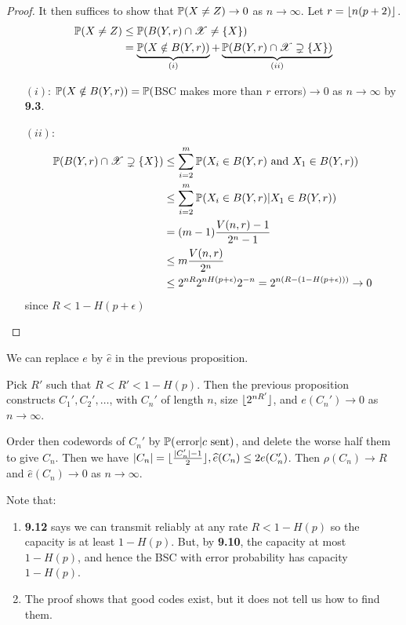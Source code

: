 \documentclass[10pt,a4paper]{article}
\begin{document}
\begin{proof}
It then suffices to show that $\P(X \neq Z) \to 0$ as $n \to \infty$. Let $r = \floor{n(p+2)}$.
\begin{align*}
\P(X \neq Z) &\leq \P(B(Y,r) \cap \mathscr{X} \neq \{X\})\\
&= \underbrace{\P(X \notin B(Y,r))}_{(i)} + \underbrace{\P(B(Y,r) \cap \mathscr{X} \supsetneq \{X\})}_{(ii)}
\end{align*}
\begin{itemize}
\item[$(i)$:] $\P(X \notin B(Y,r)) = \P($BSC makes more than $r$ errors$) \to 0$ as $n \to \infty$ by \textbf{9.3}.
\item[$(ii)$:] \begin{align*}
\P(B(Y,r) \cap \mathscr{X} \supsetneq \{X\}) &\leq \sum_{i=2}^m \P(X_i \in B(Y,r)\text{ and }X_1 \in B(Y,r))\\
&\leq \sum_{i=2}^m \P(X_i \in B(Y,r) | X_1 \in B(Y,r))\\
&= (m-1)\frac{V(n,r)-1}{2^n-1}\\
&\leq m\frac{V(n,r)}{2^n}\\
&\leq 2^{nR}2^{nH(p+\epsilon)}2^{-n} = 2^{n(R-(1-H(p+\epsilon)))} \to 0
\end{align*}
since $R < 1-H(p+\epsilon)$
\end{itemize}
\end{proof}
\begin{proposition}
We can replace $e$ by $\hat{e}$ in the previous proposition.
\end{proposition}
\begin{proposition}
Pick $R'$ such that $R<R'<1-H(p)$. Then the previous proposition constructs $C_1', C_2', \ldots$, with $C_n'$ of length $n$, size $\floor{2^{nR'}}$, and $e(C_n') \to 0$ as $n \to \infty$.

Order then codewords of $C_n'$ by $\P($error$|c\sent)$, and delete the worse half them to give $C_n$. Then we have $|C_n| = \floor{\frac{|C_n'|-1}{2}}, \hat{e}(C_n) \leq 2e(C_n')$. Then $\rho(C_n) \to R$ and $\hat{e}(C_n) \to 0$ as $n \to \infty$.
\end{proposition}
Note that:
\begin{enumerate}
\item \textbf{9.12} says we can transmit reliably at any rate $R < 1-H(p)$ so the capacity is at least $1-H(p)$. But, by \textbf{9.10}, the capacity at most $1-H(p)$, and hence the BSC with error probability has capacity $1-H(p)$.

\item The proof shows that good codes exist, but it does not tell us how to find them.
\end{enumerate}
\end{document}
